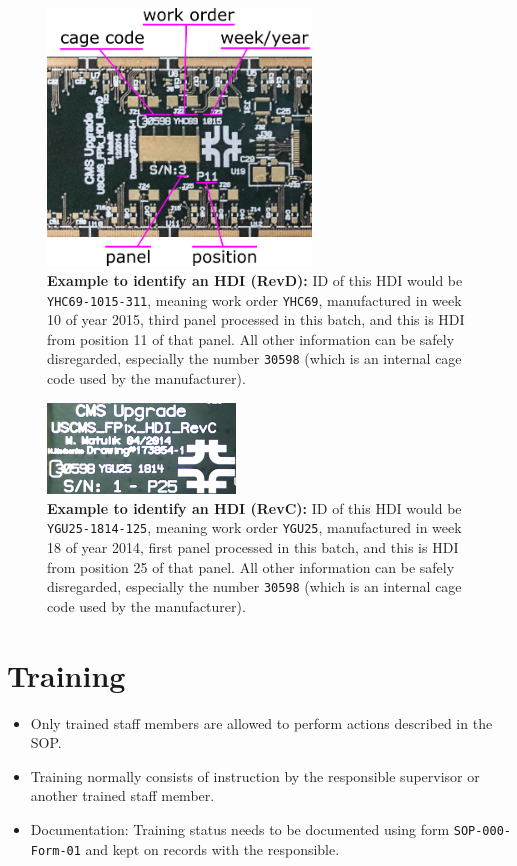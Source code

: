 \documentclass[12pt]{unlsilabsop}
\begin{document}
\begin{figure}[hH]
    \begin{center}
        \includegraphics[width=7cm]{img/HDIRevD_id.png}
        \caption{\textbf{Example to identify an HDI (RevD):} ID of this HDI would be \texttt{YHC69-1015-311}, meaning work order \texttt{YHC69}, manufactured in week 10 of year 2015, third panel processed in this batch, and this is HDI from position 11 of that panel. All other information can be safely disregarded, especially the number \texttt{30598} (which is an internal cage code used by the manufacturer).}
        \label{fig:HDI_SN_RevD}
    \end{center}
\end{figure}

\begin{figure}[hH]
    \begin{center}
        \includegraphics[width=5cm]{img/HDI_SN.jpg}
        \caption{\textbf{Example to identify an HDI (RevC):} ID of this HDI would be \texttt{YGU25-1814-125}, meaning work order \texttt{YGU25}, manufactured in week 18 of year 2014, first panel processed in this batch, and this is HDI from position 25 of that panel. All other information can be safely disregarded, especially the number \texttt{30598} (which is an internal cage code used by the manufacturer).}
        \label{fig:HDI_SN_RevC}
    \end{center}
\end{figure}

\section{Training}
\begin{itemize}
\item Only trained staff members are allowed to perform actions described in the SOP.
\item Training normally consists of instruction by the responsible supervisor or another trained staff member.
\item Documentation: Training status needs to be documented using form \texttt{SOP-000-Form-01} and kept on records with the responsible.
\end{itemize}
\end{document}
